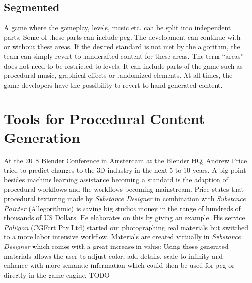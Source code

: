\documentclass[10pt,a4paper]{article}
\begin{document}
\subsection{Segmented}
\begin{multicols}{2} A game where the gameplay, levels, music etc. can be split into independent parts. Some of these parts can include \gls{pcg}. The development can continue with or without these areas. If the desired standard is not met by the algorithm, the team can simply revert to handcrafted content for these areas. The term “areas” does not need to be restricted to levels. It can include parts of the game such as procedural music, graphical effects or randomized elements. At all times, the game developers have the possibility to revert to hand-generated content.
\end{multicols}
\section{Tools for Procedural Content Generation}
\begin{multicols}{2}
At the 2018 Blender Conference in Amsterdam at the Blender HQ, Andrew Price tried to predict changes to the 3D industry in the next 5 to 10 years. A big point besides machine learning assistance becoming a standard is the adaption of procedural workflows and the workflows becoming mainstream\cite{Price2018}. Price states that procedural texturing made by \textit{Substance Designer} in combination with \textit{Substance Painter} (Allegorithmic) is saving big studios money in the range of hundreds of thousands of US Dollars. He elaborates on this by giving an example. His service \textit{Poliigon} (CGFort Pty Ltd) started out photographing real materials but switched to a more labor intensive workflow. Materials are created virtually in \textit{Substance Designer} which comes with a great increase in value: Using these generated materials allows the user to adjust color, add details, scale to infinity and enhance with more semantic information which could then be used for \gls{pcg} or directly in the game engine.
TODO \cite{Opara2016}
\end{multicols}
\end{document}
